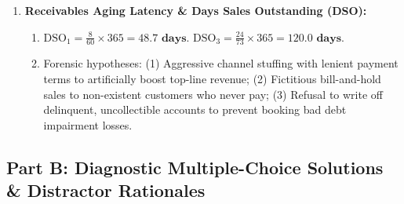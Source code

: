 \begin{enumerate}[label=\textbf{P5.\arabic*}]
    \item \textbf{Receivables Aging Latency \& Days Sales Outstanding (DSO):}
    \begin{enumerate}[label=(\alph*)]
        \item $\text{DSO}_1 = \frac{8}{60} \times 365 = \mathbf{48.7\text{ days}}$. $\text{DSO}_3 = \frac{24}{73} \times 365 = \mathbf{120.0\text{ days}}$.
        \item Forensic hypotheses: (1) Aggressive channel stuffing with lenient payment terms to artificially boost top-line revenue; (2) Fictitious bill-and-hold sales to non-existent customers who never pay; (3) Refusal to write off delinquent, uncollectible accounts to prevent booking bad debt impairment losses.
    \end{enumerate}
\end{enumerate}

\subsection*{Part B: Diagnostic Multiple-Choice Solutions \& Distractor Rationales}

